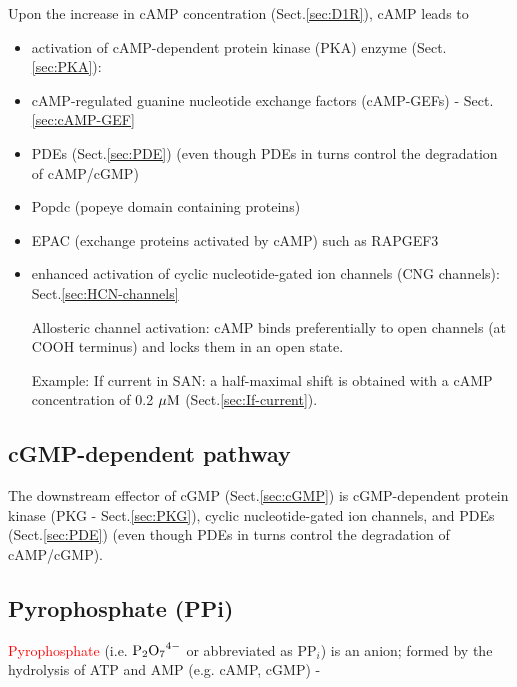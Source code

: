 Upon the increase in cAMP concentration (Sect.\ref{sec:D1R}), cAMP 
leads to
\begin{itemize}
  
  \item activation of cAMP-dependent protein kinase (PKA) enzyme (Sect.\ref{sec:PKA}):  
  
  \item cAMP-regulated guanine nucleotide exchange factors (cAMP-GEFs) -
  Sect.\ref{sec:cAMP-GEF}

  \item PDEs (Sect.\ref{sec:PDE}) (even though PDEs in turns control the
  degradation of cAMP/cGMP)

  \item Popdc (popeye domain containing proteins)

  \item EPAC (exchange proteins activated by cAMP) such as RAPGEF3

  \item enhanced activation of cyclic nucleotide-gated ion channels (CNG
  channels): Sect.\ref{sec:HCN-channels}
   
  Allosteric channel activation: cAMP binds preferentially to open channels
  (at COOH terminus) and locks them in an open state.

  Example: If current in SAN: a half-maximal shift is obtained with a cAMP
  concentration of 0.2 ${\mu\text{M}}$ (Sect.\ref{sec:If-current}).

\end{itemize}




\subsection{cGMP-dependent pathway}
\label{sec:cGMP-dependent-pathways}

The downstream effector of cGMP (Sect.\ref{sec:cGMP}) is cGMP-dependent protein
kinase (PKG - Sect.\ref{sec:PKG}), cyclic nucleotide-gated ion channels, and
PDEs (Sect.\ref{sec:PDE}) (even though PDEs in turns control the degradation of
cAMP/cGMP).

\subsection{Pyrophosphate (PPi)}
\label{sec:pyrophosphate}
\label{sec:PPi}
\label{sec:ANK-channel}

\textcolor{red}{Pyrophosphate} (i.e. $\ce{P2O7^{4-}}$ or abbreviated as PP$_i$)
is an anion; formed by the hydrolysis of ATP and AMP (e.g. cAMP, cGMP) -


